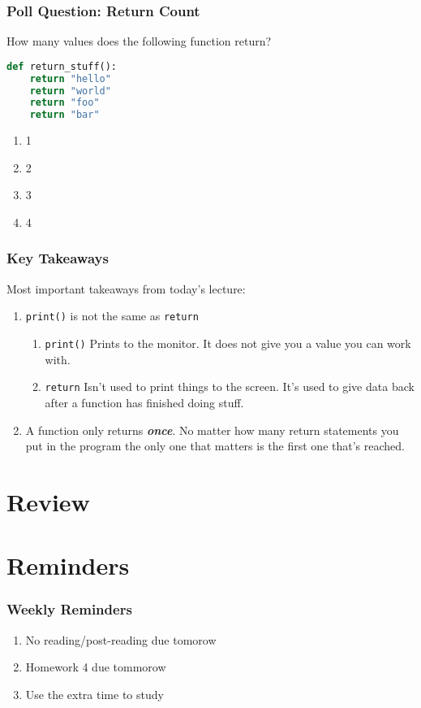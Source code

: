 \documentclass{beamer}
\begin{document}
%
%
\begin{frame}[fragile]
  \frametitle{Poll Question: Return Count} 
  How many values does the following function return?
  \begin{lstlisting}[language=Python, autogobble]
  def return_stuff():
    return "hello"
    return "world"
    return "foo"
    return "bar"
  \end{lstlisting}
  \vfill
  \begin{enumerate}[A]
    \item 1
    \item 2
    \item 3
    \item 4
  \end{enumerate}
\end{frame}

%
%
\begin{frame}
  \frametitle{Key Takeaways}
  Most important takeaways from today's lecture:
  \begin{enumerate}[A]
    \item \lstinline|print()| is not the same as \lstinline|return|
      \begin{enumerate}[A]
        \item  \lstinline|print()| \textrightarrow Prints to the monitor. It does not give you a value you can work with.
        \item  \lstinline|return| \textrightarrow Isn't used to print things to the screen. It's used to give data back after a function has finished doing stuff.
      \end{enumerate}
    \item A function only returns \textit{\textbf{once}}. No matter how many return statements you put in the program the only one that matters is the first one that's reached.
  \end{enumerate}
\end{frame}

\section{Review}

\section{Reminders}
%
%
\begin{frame}
  \frametitle{Weekly Reminders}
  \begin{enumerate}[A]
    \item No reading/post-reading due tomorow
    \item Homework 4 due tommorow
    \item Use the extra time to study
  \end{enumerate}
\end{frame}
\end{document}
